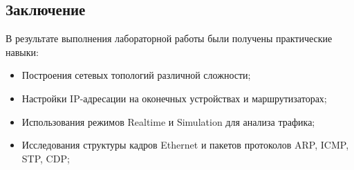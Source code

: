 \subsection*{Заключение}
В результате выполнения лабораторной работы были получены практические навыки:
\begin{itemize}
    \item Построения сетевых топологий различной сложности;
    \item Настройки IP-адресации на оконечных устройствах и маршрутизаторах;
    \item Использования режимов Realtime и Simulation для анализа трафика;
    \item Исследования структуры кадров Ethernet и пакетов протоколов ARP, ICMP, STP, CDP;
\end{itemize}



